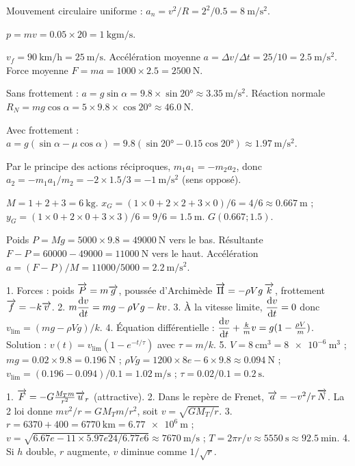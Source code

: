 Mouvement circulaire uniforme : $a_n=v^{2}/R=2^{2}/0.5=\SI{8}{\metre\per\second\squared}$.

$p=mv=0.05\times20=\SI{1}{\kilogram\metre\per\second}$.

$v_f=\SI{90}{\kilo\metre\per\hour}=\SI{25}{\metre\per\second}$. Accélération moyenne $a=\Delta v/\Delta t=25/10=\SI{2.5}{\metre\per\second\squared}$. Force moyenne $F=ma=1000\times2.5=\SI{2500}{\newton}$.

Sans frottement : $a=g\sin\alpha=9.8\times\sin\ang{20}\approx\SI{3.35}{\metre\per\second\squared}$. Réaction normale $R_N=mg\cos\alpha=5\times9.8\times\cos\ang{20}\approx\SI{46.0}{\newton}$.

Avec frottement : $a=g(\sin\alpha-\mu\cos\alpha)=9.8(\sin\ang{20}-0.15\cos\ang{20})\approx\SI{1.97}{\metre\per\second\squared}$.

Par le principe des actions réciproques, $m_1 a_1 = -m_2 a_2$, donc $a_2=-m_1 a_1/m_2=-2\times1.5/3=\SI{-1}{\metre\per\second\squared}$ (sens opposé).

$M=1+2+3=\SI{6}{\kilogram}$. $x_G=(1\times0+2\times2+3\times0)/6=4/6\approx\SI{0.667}{\metre}$ ; $y_G=(1\times0+2\times0+3\times3)/6=9/6=\SI{1.5}{\metre}$. $G(0.667;1.5)$.

Poids $P=Mg=5000\times9.8=\SI{49000}{\newton}$ vers le bas. Résultante $F-P=60000-49000=\SI{11000}{\newton}$ vers le haut. Accélération $a=(F-P)/M=11000/5000=\SI{2.2}{\metre\per\second\squared}$.

1. Forces : poids $\overrightarrow{P}=m\overrightarrow{g}$, poussée d’Archimède $\overrightarrow{\Pi}=-\rho V g\,\overrightarrow{k}$, frottement $\overrightarrow{f}=-k\overrightarrow{v}$.
2. $m\dfrac{\mathrm{d}v}{\mathrm{d}t}=mg-\rho V g - k v$.
3. À la vitesse limite, $\dfrac{\mathrm{d}v}{\mathrm{d}t}=0$ donc $v_{\text{lim}}=(mg-\rho V g)/k$.
4. Équation différentielle : $\dfrac{\mathrm{d}v}{\mathrm{d}t}+\frac{k}{m}v=g(1-\frac{\rho V}{m})$. Solution : $v(t)=v_{\text{lim}}(1-e^{-t/\tau})$ avec $\tau=m/k$.
5. $V=\SI{8}{\centi\metre\cubed}=\SI{8e-6}{\metre\cubed}$ ; $mg=0.02\times9.8=\SI{0.196}{\newton}$ ; $\rho V g=1200\times8e-6\times9.8\approx\SI{0.094}{\newton}$ ; $v_{\text{lim}}=(0.196-0.094)/0.1=\SI{1.02}{\metre\per\second}$ ; $\tau=0.02/0.1=\SI{0.2}{\second}$.

1. $\overrightarrow{F}=-G\frac{M_T m}{r^{2}}\overrightarrow{u}_r$ (attractive).
2. Dans le repère de Frenet, $\overrightarrow{a}=-v^{2}/r\,\overrightarrow{N}$. La 2\ieme{} loi donne $m v^{2}/r = G M_T m / r^{2}$, soit $v=\sqrt{G M_T / r}$.
3. $r=6370+400=\SI{6770}{\kilo\metre}=\SI{6.77e6}{\metre}$ ; $v=\sqrt{6.67e-11\times5.97e24/6.77e6}\approx\SI{7670}{\metre\per\second}$ ; $T=2\pi r/v\approx\SI{5550}{\second}\approx\SI{92.5}{\minute}$.
4. Si $h$ double, $r$ augmente, $v$ diminue comme $1/\sqrt{r}$.

\endinput